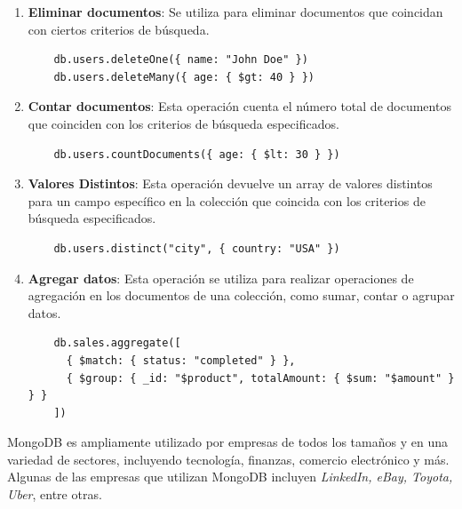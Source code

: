 \documentclass[pdflatex,sn-mathphys-num]{sn-jnl}
\theoremstyle{thmstyleone}%
\theoremstyle{thmstyletwo}%
\theoremstyle{thmstylethree}%
\begin{document}
\begin{enumerate}
    \vspace{-0.4cm}
    
    \item \textbf{Eliminar documentos}: Se utiliza para eliminar documentos que coincidan con ciertos criterios de búsqueda.
    
    \begin{verbatim}
    db.users.deleteOne({ name: "John Doe" })
    db.users.deleteMany({ age: { $gt: 40 } })
    \end{verbatim}

    \vspace{-0.25cm}
        
    \item \textbf{Contar documentos}: Esta operación cuenta el número total de documentos que coinciden con los criterios de búsqueda especificados.
    
    \begin{verbatim}
    db.users.countDocuments({ age: { $lt: 30 } })
    \end{verbatim}

    \vspace{-0.25cm}
        
    \item \textbf{Valores Distintos}: Esta operación devuelve un array de valores distintos para un campo específico en la colección que coincida con los criterios de búsqueda especificados.
    
    \begin{verbatim}
    db.users.distinct("city", { country: "USA" })
    \end{verbatim}

    \vspace{-0.25cm}
    
    \item \textbf{Agregar datos}: Esta operación se utiliza para realizar operaciones de agregación en los documentos de una colección, como sumar, contar o agrupar datos.
    
    \begin{verbatim}
    db.sales.aggregate([
      { $match: { status: "completed" } },
      { $group: { _id: "$product", totalAmount: { $sum: "$amount" } } }
    ])
    \end{verbatim}
\end{enumerate}

\vspace{-0.25cm}

MongoDB es ampliamente utilizado por empresas de todos los tamaños y en una variedad de sectores, incluyendo tecnología, finanzas, comercio electrónico y más. Algunas de las empresas que utilizan MongoDB incluyen \textit{LinkedIn, eBay, Toyota, Uber}, entre otras.
\end{document}

